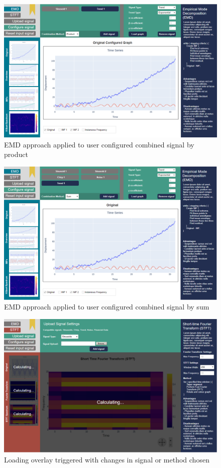 \documentclass[
  paper=a4,
  ,captions=tableheading
]{scrartcl}
\begin{document}
\begin{figure}
\centering
\includegraphics{img/EMD_multiple_product_signal.PNG}
\caption{EMD approach applied to user configured combined signal by
product}
\end{figure}

\begin{figure}
\centering
\includegraphics{img/EMD_multiple_sum_signal.PNG}
\caption{EMD approach applied to user configured combined signal by sum}
\end{figure}

\begin{figure}
\centering
\includegraphics{img/Loading_graphs.PNG}
\caption{Loading overlay triggered with changes in signal or method
chosen}
\end{figure}
\end{document}
